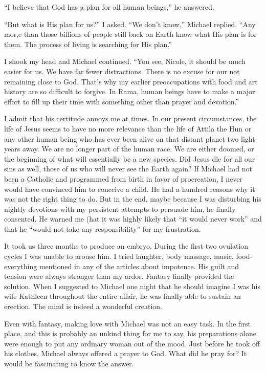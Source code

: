 \documentclass[]{article}
\begin{document}
“I believe that God has a plan for all human beings,” he answered.

“But what is His plan for us?” I asked.  “We don’t know,” Michael replied.  “Any mor,e than those billions of people still back on Earth know what His plan is for them.  The process of living is searching for His plan.”

I shook my head and Michael continued.  “You see, Nicole, it should be much easier for us.  We have far fewer distractions.  There is no excuse for our not remaining close to God.  That’s why my earlier preoccupations with food and art history are so difficult to forgive.  In Rama, human beings have to make a major effort to fill up their time with something other than prayer and devotion.”

I admit that his certitude annoys me at times.  In our present circumstances, the life of Jesus seems to have no more relevance than the life of Attila the Hun or any other human being who has ever been alive on that distant planet two light-years away.  We are no longer part of the human race.  We are either doomed, or the beginning of what will essentially be a new species.  Did Jesus die for all our sins as well, those of us who will never see the Earth again? If Michael had not been a Catholic and programmed from birth in favor of procreation, I never would have convinced him to conceive a child.  He had a hundred reasons why it was not the right thing to do.  But in the end, maybe because I was disturbing his nightly devotions with my persistent attempts to persuade him, he finally consented.  He warned me (hat it was highly likely that “it would never work” and that he “would not take any responsibility” for my frustration.

It took us three months to produce an embryo.  During the first two ovulation cycles I was unable to arouse him.  I tried laughter, body massage, music, food-everything mentioned in any of the articles about impotence.  His guilt and tension were always stronger than my ardor.  Fantasy finally provided the solution.  When I suggested to Michael one night that he should imagine I was his wife Kathleen throughout the entire affair, he was finally able to sustain an erection.  The mind is indeed a wonderful creation.

Even with fantasy, making love with Michael was not an easy task.  In the first place, and this is probably an unkind thing for me to say, his preparations alone were enough to put any ordinary woman out of the mood.  Just before he took off his clothes, Michael always offered a prayer to God.  What did he pray for? It would be fascinating to know the answer.
\end{document}
